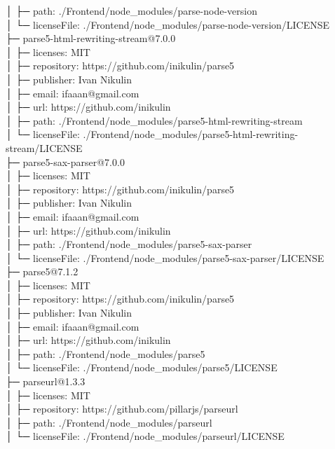 │  ├─ path: ./Frontend/node\_modules/parse-node-version\\
│  └─ licenseFile: ./Frontend/node\_modules/parse-node-version/LICENSE\\
├─ parse5-html-rewriting-stream@7.0.0\\
│  ├─ licenses: MIT\\
│  ├─ repository: https://github.com/inikulin/parse5\\
│  ├─ publisher: Ivan Nikulin\\
│  ├─ email: ifaaan@gmail.com\\
│  ├─ url: https://github.com/inikulin\\
│  ├─ path: ./Frontend/node\_modules/parse5-html-rewriting-stream\\
│  └─ licenseFile: ./Frontend/node\_modules/parse5-html-rewriting-stream/LICENSE\\
├─ parse5-sax-parser@7.0.0\\
│  ├─ licenses: MIT\\
│  ├─ repository: https://github.com/inikulin/parse5\\
│  ├─ publisher: Ivan Nikulin\\
│  ├─ email: ifaaan@gmail.com\\
│  ├─ url: https://github.com/inikulin\\
│  ├─ path: ./Frontend/node\_modules/parse5-sax-parser\\
│  └─ licenseFile: ./Frontend/node\_modules/parse5-sax-parser/LICENSE\\
├─ parse5@7.1.2\\
│  ├─ licenses: MIT\\
│  ├─ repository: https://github.com/inikulin/parse5\\
│  ├─ publisher: Ivan Nikulin\\
│  ├─ email: ifaaan@gmail.com\\
│  ├─ url: https://github.com/inikulin\\
│  ├─ path: ./Frontend/node\_modules/parse5\\
│  └─ licenseFile: ./Frontend/node\_modules/parse5/LICENSE\\
├─ parseurl@1.3.3\\
│  ├─ licenses: MIT\\
│  ├─ repository: https://github.com/pillarjs/parseurl\\
│  ├─ path: ./Frontend/node\_modules/parseurl\\
│  └─ licenseFile: ./Frontend/node\_modules/parseurl/LICENSE\\
